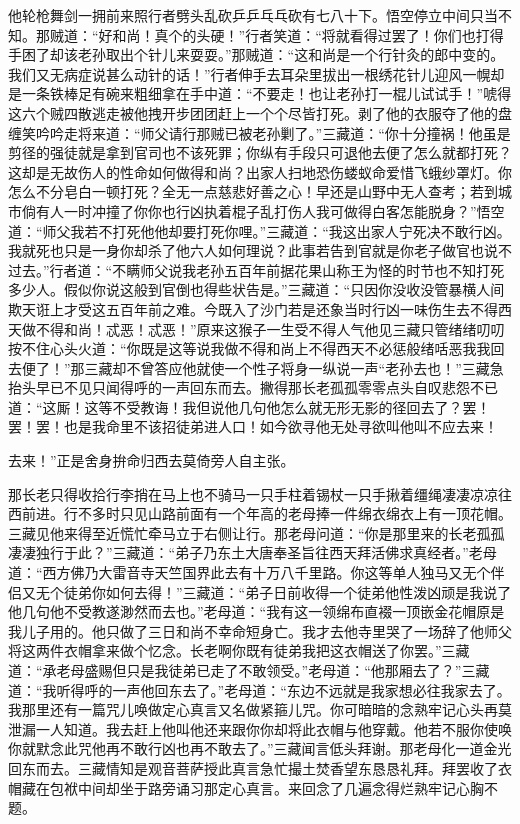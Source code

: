 \documentclass[12pt,UTF8]{ctexbook}
\begin{document}
{他轮枪舞剑一拥前来照行者劈头乱砍乒乒乓乓砍有七八十下。悟空停立中间只当不知。那贼道：“好和尚！真个的头硬！”行者笑道：“将就看得过罢了！你们也打得手困了却该老孙取出个针儿来耍耍。”那贼道：“这和尚是一个行针灸的郎中变的。我们又无病症说甚么动针的话！”行者伸手去耳朵里拔出一根绣花针儿迎风一幌却是一条铁棒足有碗来粗细拿在手中道：“不要走！也让老孙打一棍儿试试手！”唬得这六个贼四散逃走被他拽开步团团赶上一个个尽皆打死。剥了他的衣服夺了他的盘缠笑吟吟走将来道：“师父请行那贼已被老孙剿了。”三藏道：“你十分撞祸！他虽是剪径的强徒就是拿到官司也不该死罪；你纵有手段只可退他去便了怎么就都打死？这却是无故伤人的性命如何做得和尚？出家人扫地恐伤蝼蚁命爱惜飞蛾纱罩灯。你怎么不分皂白一顿打死？全无一点慈悲好善之心！早还是山野中无人查考；若到城市倘有人一时冲撞了你你也行凶执着棍子乱打伤人我可做得白客怎能脱身？”悟空道：“师父我若不打死他他却要打死你哩。”三藏道：“我这出家人宁死决不敢行凶。我就死也只是一身你却杀了他六人如何理说？此事若告到官就是你老子做官也说不过去。”行者道：“不瞒师父说我老孙五百年前据花果山称王为怪的时节也不知打死多少人。假似你说这般到官倒也得些状告是。”三藏道：“只因你没收没管暴横人间欺天诳上才受这五百年前之难。今既入了沙门若是还象当时行凶一味伤生去不得西天做不得和尚！忒恶！忒恶！”原来这猴子一生受不得人气他见三藏只管绪绪叨叨按不住心头火道：“你既是这等说我做不得和尚上不得西天不必惩般绪咶恶我我回去便了！”那三藏却不曾答应他就使一个性子将身一纵说一声“老孙去也！”三藏急抬头早已不见只闻得呼的一声回东而去。撇得那长老孤孤零零点头自叹悲怨不已道：“这厮！这等不受教诲！我但说他几句他怎么就无形无影的径回去了？罢！罢！罢！也是我命里不该招徒弟进人口！如今欲寻他无处寻欲叫他叫不应去来！

去来！”正是舍身拚命归西去莫倚旁人自主张。

那长老只得收拾行李捎在马上也不骑马一只手柱着锡杖一只手揪着缰绳凄凄凉凉往西前进。行不多时只见山路前面有一个年高的老母捧一件绵衣绵衣上有一顶花帽。三藏见他来得至近慌忙牵马立于右侧让行。那老母问道：“你是那里来的长老孤孤凄凄独行于此？”三藏道：“弟子乃东土大唐奉圣旨往西天拜活佛求真经者。”老母道：“西方佛乃大雷音寺天竺国界此去有十万八千里路。你这等单人独马又无个伴侣又无个徒弟你如何去得！”三藏道：“弟子日前收得一个徒弟他性泼凶顽是我说了他几句他不受教遂渺然而去也。”老母道：“我有这一领绵布直裰一顶嵌金花帽原是我儿子用的。他只做了三日和尚不幸命短身亡。我才去他寺里哭了一场辞了他师父将这两件衣帽拿来做个忆念。长老啊你既有徒弟我把这衣帽送了你罢。”三藏道：“承老母盛赐但只是我徒弟已走了不敢领受。”老母道：“他那厢去了？”三藏道：“我听得呼的一声他回东去了。”老母道：“东边不远就是我家想必往我家去了。我那里还有一篇咒儿唤做定心真言又名做紧箍儿咒。你可暗暗的念熟牢记心头再莫泄漏一人知道。我去赶上他叫他还来跟你你却将此衣帽与他穿戴。他若不服你使唤你就默念此咒他再不敢行凶也再不敢去了。”三藏闻言低头拜谢。那老母化一道金光回东而去。三藏情知是观音菩萨授此真言急忙撮土焚香望东恳恳礼拜。拜罢收了衣帽藏在包袱中间却坐于路旁诵习那定心真言。来回念了几遍念得烂熟牢记心胸不题。

}
\end{document}
